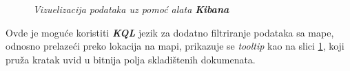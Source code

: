 \begin{figure}[H]
    \centering
    \hspace*{-0.1\columnwidth}
    \caption{\textit{Vizuelizacija podataka uz pomoć alata \textit{\textbf{Kibana}}}}
    \label{screenshot:vizuelizacija-podataka-na-mapi}
\end{figure}

\par
Ovde je moguće koristiti \textit{\textbf{KQL}} jezik za dodatno filtriranje podataka sa mape, odnosno prelazeći preko lokacija na mapi, prikazuje se \textit{tooltip} kao na slici \ref{screenshot:vizuelizacija-podataka-na-mapi}, koji pruža kratak uvid u bitnija polja skladištenih dokumenata.